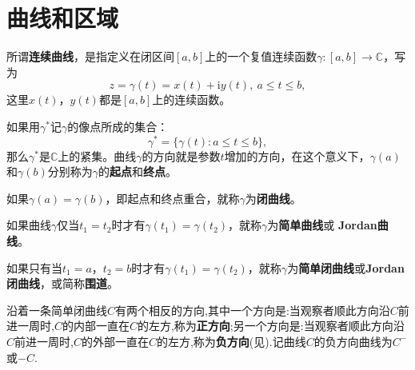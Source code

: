 \documentclass[../../main.tex]{subfiles}%
\begin{document}
\section{曲线和区域}

\begin{definition}[连续曲线]
所谓\textbf{连续曲线}，是指定义在闭区间\([a, b]\)上的一个复值连续函数\(\gamma: [a, b] \to \mathbb{C}\)，写为
\[
z = \gamma(t) = x(t) + \mathrm{i}y(t), \ a \leqslant t \leqslant b,
\]
这里\(x(t)\)，\(y(t)\)都是\([a, b]\)上的连续函数。

如果用\(\gamma^*\)记\(\gamma\)的像点所成的集合：
\[
\gamma^* = \{ \gamma(t) : a \leqslant t \leqslant b \},
\]
那么\(\gamma^*\)是\(\mathbb{C}\)上的紧集。曲线\(\gamma\)的方向就是参数\(t\)增加的方向，在这个意义下，\(\gamma(a)\)和\(\gamma(b)\)分别称为\(\gamma\)的\textbf{起点}和\textbf{终点}。

如果\(\gamma(a) = \gamma(b)\)，即起点和终点重合，就称\(\gamma\)为\textbf{闭曲线}。

如果曲线\(\gamma\)仅当\(t_1 = t_2\)时才有\(\gamma(t_1) = \gamma(t_2)\)，就称\(\gamma\)为\textbf{简单曲线}或 \textbf{Jordan曲线}。

如果只有当\(t_1 = a\)，\(t_2 = b\)时才有\(\gamma(t_1) = \gamma(t_2)\)，就称\(\gamma\)为\textbf{简单闭曲线}或\textbf{Jordan闭曲线}，或简称\textbf{围道}。

沿着一条简单闭曲线$C$有两个相反的方向,其中一个方向是:当观察者顺此方向沿$C$前进一周时,$C$的内部一直在$C$的左方,称为\textbf{正方向};另一个方向是:当观察者顺此方向沿$C$前进一周时,$C$的外部一直在$C$的左方,称为\textbf{负方向}(见).记曲线$C$的负方向曲线为$C^-$或$-C$.
\end{definition}
\end{document}
